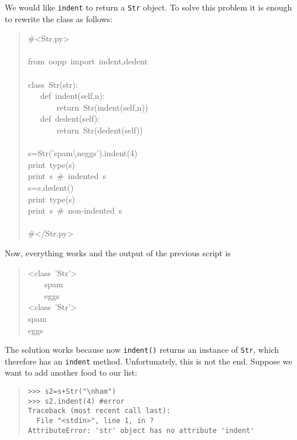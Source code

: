 \documentclass[10pt,english]{article}
\begin{document}
We would like \texttt{indent} to return a \texttt{Str} object. To solve this problem
it is enough to rewrite the class as follows:
\begin{quote}
\begin{ttfamily}\begin{flushleft}
\mbox{{\#}<Str.py>}\\
\mbox{}\\
\mbox{from~oopp~import~indent,dedent}\\
\mbox{}\\
\mbox{class~Str(str):}\\
\mbox{~~~def~indent(self,n):}\\
\mbox{~~~~~~~return~Str(indent(self,n))}\\
\mbox{~~~def~dedent(self):}\\
\mbox{~~~~~~~return~Str(dedent(self))}\\
\mbox{}\\
\mbox{s=Str('spam{\textbackslash}neggs').indent(4)}\\
\mbox{print~type(s)}\\
\mbox{print~s~{\#}~indented~s}\\
\mbox{s=s.dedent()}\\
\mbox{print~type(s)}\\
\mbox{print~s~{\#}~non-indented~s}\\
\mbox{}\\
\mbox{{\#}</Str.py>}
\end{flushleft}\end{ttfamily}
\end{quote}

Now, everything works and the output of the previous script is
\begin{quote}
\begin{ttfamily}\begin{flushleft}
\mbox{<class~'Str'>}\\
\mbox{~~~~spam}\\
\mbox{~~~~eggs}\\
\mbox{<class~'Str'>}\\
\mbox{spam}\\
\mbox{eggs}
\end{flushleft}\end{ttfamily}
\end{quote}

The solution works because now \texttt{indent()} returns an instance
of \texttt{Str}, which therefore has an \texttt{indent} method. Unfortunately,
this is not the end. Suppose we want to add another food to our list:
\begin{quote}
\begin{verbatim}>>> s2=s+Str("\nham")
>>> s2.indent(4) #error
Traceback (most recent call last):
  File "<stdin>", line 1, in ?
AttributeError: 'str' object has no attribute 'indent'\end{verbatim}
\end{quote}
\end{document}
